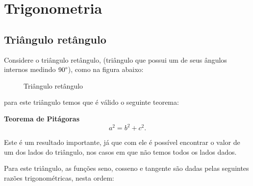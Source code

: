 
\chapter{Trigonometria}

 \section{Triângulo retângulo}

  Considere o triângulo retângulo, (triângulo que possui um de seus ângulos internos medindo $90 \degree$), como na figura abaixo:
  \begin{figure}[H]
   \centering
   \caption{Triângulo retângulo}
  \end{figure}
 para este triângulo temos que é válido o seguinte teorema:

 \vskip0.3cm

\colorbox{azul}{
 \begin{minipage}{0.9\linewidth}
 \begin{center}
 \textbf{Teorema de Pitágoras}
  \[a^2= b^2 + c^2.\]
 \end{center}
 \end{minipage}}

 \vskip0.3cm

 Este é um resultado importante, já que com ele é possível encontrar o valor de um dos lados do triângulo, nos casos em que não temos todos os lados dados.

 Para este triângulo, as funções seno, cosseno e tangente são dadas pelas seguintes razões trigonométricas, nesta ordem:

 \vskip0.3cm

